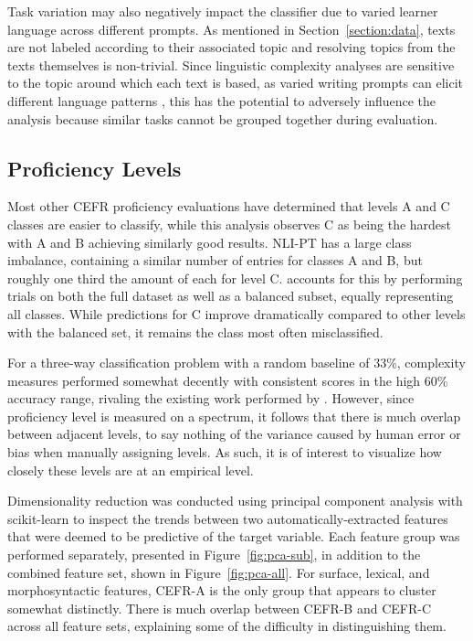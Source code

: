 Task variation may also negatively impact the classifier due to varied learner language across different prompts. As mentioned in Section~\ref{section:data}, texts are not labeled according to their associated topic and resolving topics from the texts themselves is non-trivial. Since linguistic complexity analyses are sensitive to the topic around which each text is based, as varied writing prompts can elicit different language patterns \citep{ventura2015, yang2015}, this has the potential to adversely influence the analysis because similar tasks cannot be grouped together during evaluation.

\subsection{Proficiency Levels}

Most other CEFR proficiency evaluations have determined that levels A and C classes are easier to classify, while this analysis observes C as being the hardest with A and B achieving similarly good results. NLI-PT has a large class imbalance, containing a similar number of entries for classes A and B, but roughly one third the amount of each for level C.  accounts for this by performing trials on both the full dataset as well as a balanced subset, equally representing all classes. While predictions for C improve dramatically compared to other levels with the balanced set, it remains the class most often misclassified.

For a three-way classification problem with a random baseline of 33\%, complexity measures performed somewhat decently with consistent scores in the high 60\% accuracy range, rivaling the existing work performed by \cite{delrio2019a}. However, since proficiency level is measured on a spectrum, it follows that there is much overlap between adjacent levels, to say nothing of the variance caused by human error or bias when manually assigning levels. As such, it is of interest to visualize how closely these levels are at an empirical level.

Dimensionality reduction was conducted using principal component analysis with scikit-learn to inspect the trends between two automatically-extracted features that were deemed to be predictive of the target variable. Each feature group was performed separately, presented in Figure~\ref{fig:pca-sub}, in addition to the combined feature set, shown in Figure~\ref{fig:pca-all}. For surface, lexical, and morphosyntactic features, CEFR-A is the only group that appears to cluster somewhat distinctly. There is much overlap between CEFR-B and CEFR-C across all feature sets, explaining some of the difficulty in distinguishing them.

